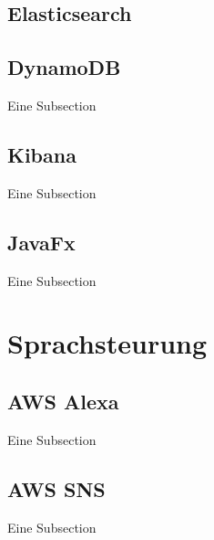 		\subsection{Elasticsearch}
        
		\subsection{DynamoDB}
        Eine Subsection
		\subsection{Kibana}
        Eine Subsection
		\subsection{JavaFx}
        Eine Subsection
        \newpage
	\section{Sprachsteurung}
        \subsection{AWS Alexa}
        Eine Subsection
		\subsection{AWS SNS}
        Eine Subsection
        \newpage